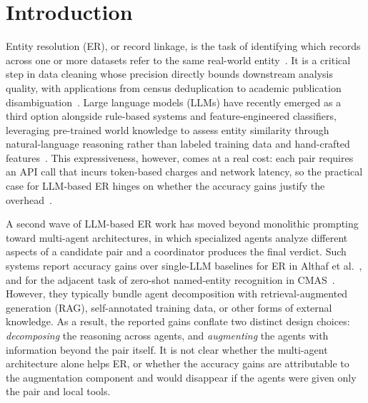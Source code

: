 \documentclass[sigconf]{acmart}
\begin{document}
\section{Introduction}

Entity resolution (ER), or record linkage, is the task of identifying which records across one or more datasets refer to the same real-world entity~\cite{binette2022almost}.
It is a critical step in data cleaning whose precision directly bounds downstream analysis quality, with applications from census deduplication to academic publication disambiguation~\cite{christophides2020overview}.
Large language models (LLMs) have recently emerged as a third option alongside rule-based systems and feature-engineered classifiers, leveraging pre-trained world knowledge to assess entity similarity through natural-language reasoning rather than labeled training data and hand-crafted features~\cite{wang2025match, zhang2025deep}.
This expressiveness, however, comes at a real cost: each pair requires an API call that incurs token-based charges and network latency, so the practical case for LLM-based ER hinges on whether the accuracy gains justify the overhead~\cite{li2024booster, nananukul2024cost}.

A second wave of LLM-based ER work has moved beyond monolithic prompting toward multi-agent architectures, in which specialized agents analyze different aspects of a candidate pair and a coordinator produces the final verdict.
Such systems report accuracy gains over single-LLM baselines for ER in Althaf et al.~\cite{althaf2025multi}, and for the adjacent task of zero-shot named-entity recognition in CMAS~\cite{wang2025cooperative}.
However, they typically bundle agent decomposition with retrieval-augmented generation (RAG), self-annotated training data, or other forms of external knowledge.
As a result, the reported gains conflate two distinct design choices: \emph{decomposing} the reasoning across agents, and \emph{augmenting} the agents with information beyond the pair itself.
It is not clear whether the multi-agent architecture alone helps ER, or whether the accuracy gains are attributable to the augmentation component and would disappear if the agents were given only the pair and local tools.
\end{document}
